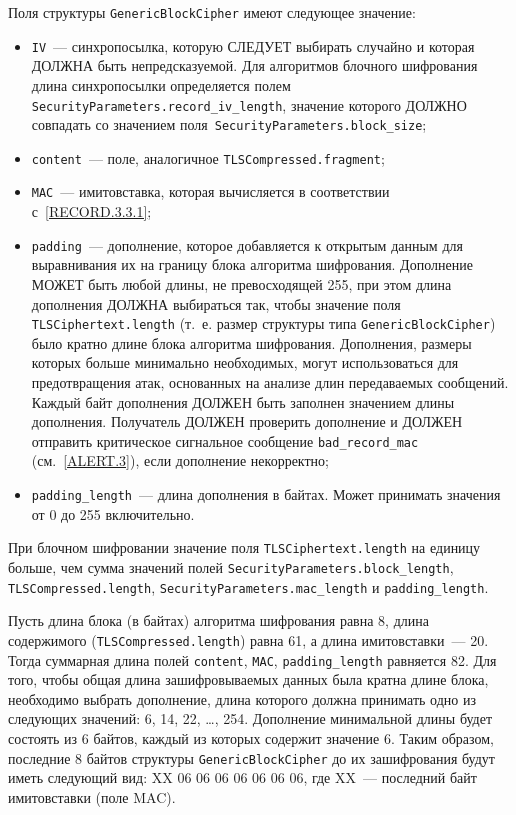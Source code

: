 Поля структуры \lstinline{GenericBlockCipher} имеют следующее значение:
\begin{itemize}
\item[--]
\lstinline{IV}~--- синхропосылка, которую СЛЕДУЕТ выбирать случайно и которая ДОЛЖНА 
быть непредсказуемой. Для алгоритмов блочного шифрования длина 
синхропосылки определяется полем \lstinline{SecurityParameters.record_iv_length}, 
значение которого ДОЛЖНО совпадать со значением 
поля~\lstinline{SecurityParameters.block_size}; 

\item[--] 
\lstinline{content}~--- поле, аналогичное \lstinline{TLSCompressed.fragment};

\item[--]
\lstinline{MAC}~--- имитовставка, которая вычисляется в соответствии 
с~\ref{RECORD.3.3.1};

\item[--]
\lstinline{padding}~--- дополнение, которое добавляется к открытым данным для 
выравнивания их на границу блока алгоритма шифрования. Дополнение МОЖЕТ 
быть любой длины, не превосходящей 255, при этом длина дополнения ДОЛЖНА 
выбираться так, чтобы значение поля \lstinline{TLSCiphertext.length} 
(т.~е. размер структуры типа \lstinline{GenericBlockCipher}) было кратно 
длине блока алгоритма шифрования. Дополнения, размеры которых больше 
минимально необходимых, могут использоваться для предотвращения атак, 
основанных на анализе длин передаваемых сообщений. Каждый байт дополнения 
ДОЛЖЕН быть заполнен значением длины дополнения. Получатель ДОЛЖЕН 
проверить дополнение и ДОЛЖЕН отправить критическое сигнальное сообщение 
\lstinline{bad_record_mac} (см.~\ref{ALERT.3}), если дополнение 
некорректно;

\item[--]
\lstinline{padding_length}~--- длина дополнения в байтах. Может принимать 
значения от 0 до 255 включительно.  
\end{itemize}

При блочном шифровании значение поля \lstinline{TLSCiphertext.length} на 
единицу больше, чем сумма значений полей 
\lstinline{SecurityParameters.block_length},  
\lstinline{TLSCompressed.length}, 
\lstinline{SecurityParameters.mac_length} и \lstinline{padding_length}.  

\begin{example*}
Пусть длина блока (в байтах) алгоритма шифрования равна 8, 
длина содержимого (\lstinline{TLSCompressed.length}) равна 61, 
а длина имитовставки~--- 20. 
Тогда суммарная длина полей \lstinline{content}, \lstinline{MAC}, 
\lstinline{padding_length} равняется 82. Для того, чтобы общая длина 
зашифровываемых данных была кратна длине блока, необходимо выбрать 
дополнение, длина которого должна принимать одно из следующих значений: 6, 
14, 22, \ldots, 254. Дополнение минимальной длины будет  
состоять из 6 байтов, каждый из которых содержит значение 6. Таким 
образом, последние 8 байтов структуры \lstinline{GenericBlockCipher} до их 
зашифрования будут иметь следующий вид: XX 06 06 06 06 06 06 06, где XX~--- 
последний байт имитовставки (поле MAC).
\end{example*}

